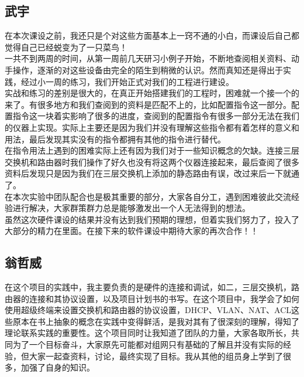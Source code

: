 	\subsection*{武宇}
\indent 	在本次课设之前，我还只是个对这些方面基本上一窍不通的小白，而课设后自己都觉得自己已经蜕变为了一只菜鸟！\\
\indent 	一共不到两周的时间，从第一周前几天研习小例子开始，不断地查阅相关资料、动手操作，逐渐的对这些设备由完全的陌生到稍微的认识。然而真知还是得出于实践，经过小一周的练习，我们开始正式对我们的工程进行建设。\\
\indent 	实战和练习的差别是很大的，在真正开始搭建我们的工程时，困难就一个接一个的来了。有很多地方和我们查阅到的资料是匹配不上的，比如配置指令这一部分。配置指令这一块着实影响了很多的进度，查阅到的配置指令有很多一部分无法在我们的仪器上实现。实际上主要还是因为我们并没有理解这些指令都有着怎样的意义和用法，最后发现其实没有的指令都拥有其他的指令进行替代。\\
\indent 	在指令用法上遇到的困难实际上还有因为我们对于一些知识概念的欠缺。连接三层交换机和路由器时我们操作了好久也没有将这两个仪器连接起来，最后查阅了很多资料后发现只是因为我们在三层交换机上添加的静态路由有误，改过来后一下就通了。\\
\indent 	在本次实验中团队配合也是极其重要的部分，大家各自分工，遇到困难彼此交流经验进行解决，大家群策群力总是能够激发出一个人无法得到的想法。\\
\indent 	虽然这次硬件课设的结果并没有达到我们预期的理想，但着实我们努力了，投入了大部分的精力在里面。在接下来的软件课设中期待大家的再次合作！！\\
	\subsection*{翁哲威}
在这个项目的实践中，我主要负责的是硬件的连接和调试，如二，三层交换机，路由器的连接和其协议设置，以及项目计划书的书写。在这个项目中，我学会了如何使用超级终端来设置交换机和路由器的协议设置，DHCP、VLAN、NAT、ACL这些原本在书上抽象的概念在实践中变得鲜活，是我对其有了很深刻的理解，得知了理论联系实践的重要性。这个项目同时让我知道了团队的力量，大家各取所长，共同为了一个目标奋斗，大家原先可能都对组网只有基础的了解且并没有实际的经验，但大家一起查资料，讨论，最终实现了目标。我从其他的组员身上学到了很多，加强了自身的知识。
